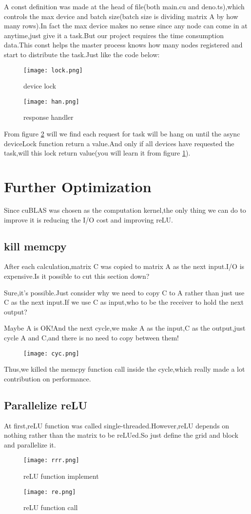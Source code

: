 \documentclass[12pt]{scrartcl} %
\begin{document}
A const definition was made at the head of file(both main.cu and deno.ts),which controls the max device and batch size(batch size is dividing matrix A by how many rows).In fact the max device makes no sense since any node can come in at anytime,just give it a task.But our project requires the time consumption data.This const helps the master process knows how many nodes registered and start to distribute the task.Just like the code below:
\begin{figure}[H]
    \centering
    \texttt{[image: lock.png]}
    \caption{device lock}
    \label{dd}
\end{figure}
\begin{figure}[H]
    \centering
    \texttt{[image: han.png]}
    \caption{response handler}
    \label{rr}
\end{figure}
From figure \ref{rr} will we find each request for task will be hang on until the async deviceLock function return a value.And only if all devices have requested the task,will this lock return value(you will learn it from figure \ref{dd}).
\section{Further Optimization}
Since cuBLAS was chosen as the computation kernel,the only thing we can do to improve it is reducing the I/O cost and improving reLU.
\subsection{kill memcpy}
After each calculation,matrix C was copied to matrix A as the next input.I/O is expensive.Is it possible to cut this section down?

Sure,it's possible.Just consider why we need to copy C to A rather than just use C as the next input.If we use C as input,who to be the receiver to hold the next output?

Maybe A is OK!And the next cycle,we make A as the input,C as the output,just cycle A and C,and there is no need to copy between them!
\begin{figure}[H]
    \centering
    \texttt{[image: cyc.png]}
\end{figure}
Thus,we killed the memcpy function call inside the cycle,which really made a lot contribution on performance.

\subsection{Parallelize reLU}
At first,reLU function was called single-threaded.However,reLU depends on nothing rather than the matrix to be reLUed.So just define the grid and block and parallelize it.
\begin{figure}[H]
    \centering
    \texttt{[image: rrr.png]}
    \caption{reLU function implement}
\end{figure}
\begin{figure}[H]
    \centering
    \texttt{[image: re.png]}
    \caption{reLU function call}
\end{figure}
\end{document}
